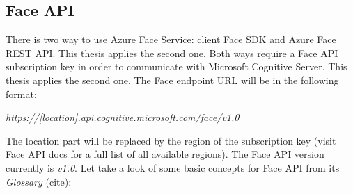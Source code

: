 \subsection{Face API}
There is two way to use Azure Face Service: client Face SDK and Azure Face REST API. This thesis applies the second one. Both ways require a Face API subscription key in order to communicate with Microsoft Cognitive Server. This thesis applies the second one. The Face endpoint URL will be in the following format:
\begin{center}
\textit{https://[location].api.cognitive.microsoft.com/face/v1.0}
\end{center}
The location part will be replaced by the region of the subscription key (visit \href{https://westus.dev.cognitive.microsoft.com/docs/services/563879b61984550e40cbbe8d/operations/563879b61984550f30395236}{Face API docs} for a full list of all available regions). The Face API version currently is \textit{v1.0}.
Let take a look of some basic concepts for Face API from its \textit{Glossary} (cite):
